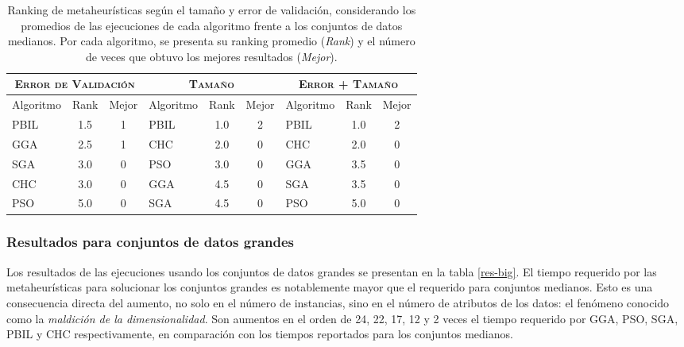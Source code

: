 \begin{table}[h!]
\centering
\begin{tabular}{l c c|l c c|l c c}
\hline
\multicolumn{3}{c|}{\textsc{Error de Validación}}
	& \multicolumn{3}{c|}{\textsc{Tamaño}}
	& \multicolumn{3}{c}{\textsc{Error + Tamaño}} \\
\hline
Algoritmo & Rank & Mejor & Algoritmo & Rank & Mejor & Algoritmo & Rank & Mejor \\
\hline
\hline
PBIL & 1.5 & 1 & PBIL & 1.0 & 2 & PBIL & 1.0 & 2 \\
GGA  & 2.5 & 1 & CHC  & 2.0 & 0 & CHC  & 2.0 & 0 \\
SGA  & 3.0 & 0 & PSO  & 3.0 & 0 & GGA  & 3.5 & 0 \\
CHC  & 3.0 & 0 & GGA  & 4.5 & 0 & SGA  & 3.5 & 0 \\
PSO  & 5.0 & 0 & SGA  & 4.5 & 0 & PSO  & 5.0 & 0 \\
\hline
\end{tabular}
\caption[Ranking de metaheurísticas según el tamaño y error de validación en conjuntos de datos medianos]{Ranking de metaheurísticas según el tamaño y error de validación, considerando los promedios de las ejecuciones de cada algoritmo frente a los conjuntos de datos medianos. Por cada algoritmo, se presenta su ranking promedio (\emph{Rank}) y el número de veces que obtuvo los mejores resultados (\emph{Mejor}).}
\label{res-med-rank}
\end{table}

\subsubsection{Resultados para conjuntos de datos grandes}

Los resultados de las ejecuciones usando los conjuntos de datos grandes se presentan en la tabla \ref{res-big}. El tiempo requerido por las metaheurísticas para solucionar los conjuntos grandes es notablemente mayor que el requerido para conjuntos medianos. Esto es una consecuencia directa del aumento, no solo en el número de instancias, sino en el número de atributos de los datos: el fenómeno conocido como la \guillemotleft\emph{maldición de la dimensionalidad}\guillemotright. Son aumentos en el orden de 24, 22, 17, 12 y 2 veces el tiempo requerido por GGA, PSO, SGA, PBIL y CHC respectivamente, en comparación con los tiempos reportados para los conjuntos medianos.

